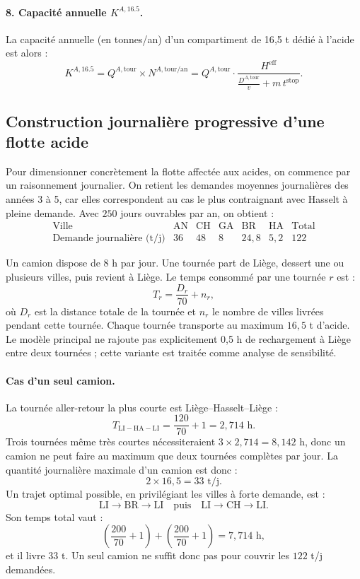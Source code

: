 \documentclass{article}
\begin{document}
\paragraph{8. Capacité annuelle $K^{A,16.5}$.}

La capacité annuelle (en tonnes/an) d'un compartiment de 16{,}5 t dédié à l'acide est alors :
\begin{equation}
  K^{A,16.5}
  =
  Q^{A,\text{tour}} \times N^{A,\text{tour/an}}
  =
  Q^{A,\text{tour}} \cdot
  \frac{H^{\text{eff}}}{\frac{D^{A,\text{tour}}}{v} + m \, t^{\text{stop}}}.
\end{equation}

\subsection{Construction journalière progressive d'une flotte acide}

Pour dimensionner concrètement la flotte affectée aux acides, on commence par un
raisonnement journalier. On retient les demandes moyennes journalières des années
3 à 5, car elles correspondent au cas le plus contraignant avec Hasselt à pleine
demande. Avec $250$ jours ouvrables par an, on obtient :
\[
\begin{array}{c|ccccc|c}
\text{Ville} & \mathrm{AN} & \mathrm{CH} & \mathrm{GA} & \mathrm{BR} & \mathrm{HA} & \text{Total} \\
\hline
\text{Demande journalière (t/j)} & 36 & 48 & 8 & 24{,}8 & 5{,}2 & 122
\end{array}
\]

Un camion dispose de $8$ h par jour. Une tournée part de Liège, dessert une ou
plusieurs villes, puis revient à Liège. Le temps consommé par une tournée $r$ est :
\[
  T_r = \frac{D_r}{70} + n_r,
\]
où $D_r$ est la distance totale de la tournée et $n_r$ le nombre de villes livrées
pendant cette tournée. Chaque tournée transporte au maximum $16{,}5$ t d'acide.
Le modèle principal ne rajoute pas explicitement 0,5 h de rechargement à Liège
entre deux tournées ; cette variante est traitée comme analyse de sensibilité.

\paragraph{Cas d'un seul camion.}
La tournée aller-retour la plus courte est Liège--Hasselt--Liège :
\[
  T_{\mathrm{LI-HA-LI}} = \frac{120}{70} + 1 = 2{,}714 \text{ h}.
\]
Trois tournées même très courtes nécessiteraient $3 \times 2{,}714 = 8{,}142$ h,
donc un camion ne peut faire au maximum que deux tournées complètes par jour.
La quantité journalière maximale d'un camion est donc :
\[
  2 \times 16{,}5 = 33 \text{ t/j}.
\]
Un trajet optimal possible, en privilégiant les villes à forte demande, est :
\[
\mathrm{LI}\to\mathrm{BR}\to\mathrm{LI}
\quad\text{puis}\quad
\mathrm{LI}\to\mathrm{CH}\to\mathrm{LI}.
\]
Son temps total vaut :
\[
  \left(\frac{200}{70}+1\right) + \left(\frac{200}{70}+1\right)
  = 7{,}714 \text{ h},
\]
et il livre $33$ t. Un seul camion ne suffit donc pas pour couvrir les
$122$ t/j demandées.
\end{document}
